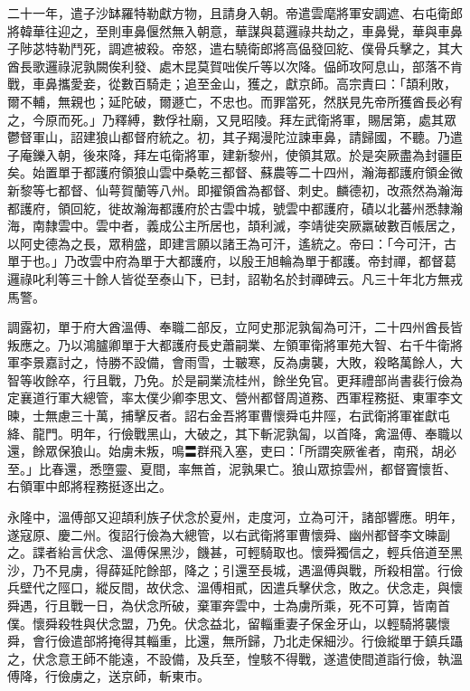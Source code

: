 \begin{pinyinscope}
 二十一年，遣子沙缽羅特勒獻方物，且請身入朝。帝遣雲麾將軍安調遮、右屯衛郎將韓華往迎之，至則車鼻偃然無入朝意，華謀與葛邏祿共劫之，車鼻覺，華與車鼻子陟苾特勒鬥死，調遮被殺。帝怒，遣右驍衛郎將高偘發回紇、僕骨兵擊之，其大酋長歌邏祿泥孰闕俟利發、處木昆莫賀咄俟斤等以次降。偘師攻阿息山，部落不肯戰，車鼻攜愛妾，從數百騎走；追至金山，獲之，獻京師。高宗責曰：「頡利敗，爾不輔，無親也；延陀破，爾遯亡，不忠也。而罪當死，然朕見先帝所獲酋長必宥之，今原而死。」乃釋縛，數俘社廟，又見昭陵。拜左武衛將軍，賜居第，處其眾鬱督軍山，詔建狼山都督府統之。初，其子羯漫陀泣諫車鼻，請歸國，不聽。乃遣子庵鑠入朝，後來降，拜左屯衛將軍，建新黎州，使領其眾。於是突厥盡為封疆臣矣。始置單于都護府領狼山雲中桑乾三都督、蘇農等二十四州，瀚海都護府領金微新黎等七都督、仙萼賀蘭等八州。即擢領酋為都督、刺史。麟德初，改燕然為瀚海都護府，領回紇，徙故瀚海都護府於古雲中城，號雲中都護府，磧以北蕃州悉隸瀚海，南隸雲中。雲中者，義成公主所居也，頡利滅，李靖徙突厥羸破數百帳居之，以阿史德為之長，眾稍盛，即建言願以諸王為可汗，遙統之。帝曰：「今可汗，古單于也。」乃改雲中府為單于大都護府，以殷王旭輪為單于都護。帝封禪，都督葛邏祿叱利等三十餘人皆從至泰山下，已封，詔勒名於封禪碑云。凡三十年北方無戎馬警。



 調露初，單于府大酋溫傅、奉職二部反，立阿史那泥孰匐為可汗，二十四州酋長皆叛應之。乃以鴻臚卿單于大都護府長史蕭嗣業、左領軍衛將軍苑大智、右千牛衛將軍李景嘉討之，恃勝不設備，會雨雪，士皸寒，反為虜襲，大敗，殺略萬餘人，大智等收餘卒，行且戰，乃免。於是嗣業流桂州，餘坐免官。更拜禮部尚書裴行儉為定襄道行軍大總管，率太僕少卿李思文、營州都督周道務、西軍程務挺、東軍李文暕，士無慮三十萬，捕擊反者。詔右金吾將軍曹懷舜屯井陘，右武衛將軍崔獻屯絳、龍門。明年，行儉戰黑山，大破之，其下斬泥孰匐，以首降，禽溫傅、奉職以還，餘眾保狼山。始虜未叛，鳴〓群飛入塞，吏曰：「所謂突厥雀者，南飛，胡必至。」比春還，悉墮靈、夏間，率無首，泥孰果亡。狼山眾掠雲州，都督竇懷哲、右領軍中郎將程務挺逐出之。



 永隆中，溫傅部又迎頡利族子伏念於夏州，走度河，立為可汗，諸部響應。明年，遂寇原、慶二州。復詔行儉為大總管，以右武衛將軍曹懷舜、幽州都督李文暕副之。諜者紿言伏念、溫傅保黑沙，饑甚，可輕騎取也。懷舜獨信之，輕兵倍道至黑沙，乃不見虜，得薛延陀餘部，降之；引還至長城，遇溫傅與戰，所殺相當。行儉兵壁代之陘口，縱反間，故伏念、溫傅相貳，因遣兵擊伏念，敗之。伏念走，與懷舜遇，行且戰一日，為伏念所破，棄軍奔雲中，士為虜所乘，死不可算，皆南首僕。懷舜殺牲與伏念盟，乃免。伏念益北，留輜重妻子保金牙山，以輕騎將襲懷舜，會行儉遣部將掩得其輜重，比還，無所歸，乃北走保細沙。行儉縱單于鎮兵躡之，伏念意王師不能遠，不設備，及兵至，惶駭不得戰，遂遣使間道詣行儉，執溫傅降，行儉虜之，送京師，斬東市。




\end{pinyinscope}
